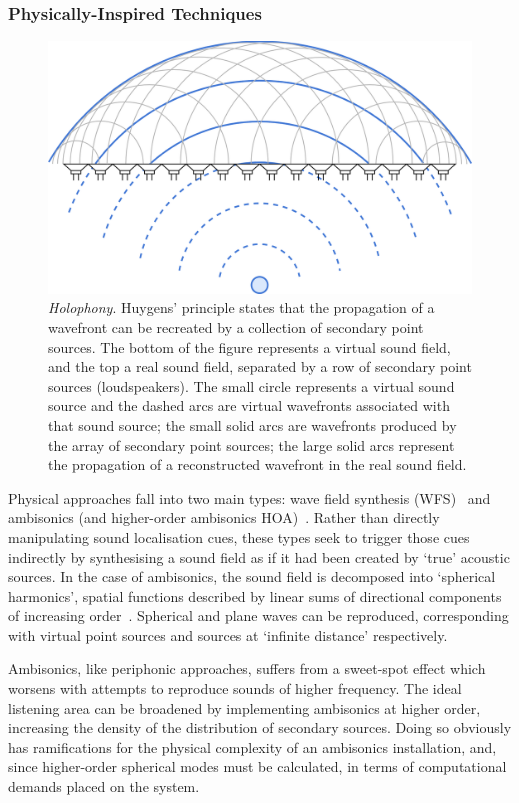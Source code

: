 \subsubsection{Physically-Inspired Techniques}\label{subsubsec:sound-field-synthesis}

\begin{figure}[ht]
    \centering
    \includegraphics[width=.75\textwidth]{figures/wfs_1}
    \caption{\textit{Holophony}.
    Huygens' principle states that the propagation of a wavefront
    can be recreated by a collection of secondary point sources.
    The bottom of the figure represents a virtual sound field, and the top a
    real sound field, separated by a row of secondary point sources
        (loudspeakers).
        The small circle represents a virtual sound source and the dashed arcs
        are virtual wavefronts associated with that sound source;
        the small solid arcs are wavefronts produced by the array of secondary
        point sources;
        the large solid arcs represent the propagation of a reconstructed
        wavefront in the real sound field.}
    \label{fig:wfs_1}
\end{figure}

Physical approaches fall into two main types: wave field synthesis
(WFS)~\citep{berkhout_acoustic_1993} and
ambisonics (and higher-order ambisonics \textemdash{}
HOA)~\citep{frank_producing_2015}.
Rather than directly manipulating sound localisation cues, these types seek to
trigger those cues indirectly by synthesising a sound field as if it had been
created by `true' acoustic sources.
In the case of ambisonics, the sound field is decomposed into `spherical
harmonics', spatial functions described by linear sums of directional
components of increasing order~\citep{nicol_sound_2017}.
Spherical and plane waves can be reproduced, corresponding with virtual
point sources and sources at `infinite distance' respectively.

Ambisonics, like periphonic approaches, suffers from a sweet-spot effect which
worsens with attempts to reproduce sounds of higher frequency.
The ideal listening area can be broadened by implementing ambisonics at higher
order, increasing the density of the distribution of secondary sources.
Doing so obviously has ramifications for the physical complexity of an
ambisonics installation, and, since higher-order spherical modes must be
calculated, in terms of computational demands placed on the system.

